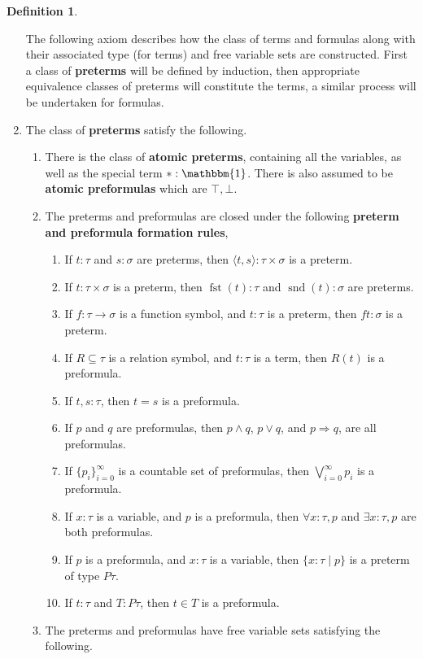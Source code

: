\documentclass{birkjour}
\theoremstyle{plain}
\theoremstyle{definition}
\newtheorem{definition}[thm]{Definition} %
\begin{document}
\begin{definition}
\begin{enumerate}
			The following axiom describes how the class of terms and formulas along with their associated type (for terms) and free variable sets are constructed. First a class of \textbf{preterms} will be defined by induction, then appropriate equivalence classes of preterms will constitute the terms, a similar process will be undertaken for formulas.
			\item The class of \textbf{preterms} satisfy the following.
			\begin{enumerate}
				\item There is the class of \textbf{atomic preterms}, containing all the variables, as well as the special term $\ast : \mathbbm{1}$. There is also assumed to be \textbf{atomic preformulas} which are $\top, \bot$.
				\item The preterms and preformulas are closed under the following \textbf{preterm and preformula formation rules},
				\begin{enumerate}
					\item If $t:\tau$ and $s:\sigma$ are preterms, then $\langle t,s\rangle : \tau \times \sigma$ is a preterm.
					\item If $t: \tau \times \sigma$ is a preterm, then $\operatorname{fst}(t) : \tau$ and $\operatorname{snd}(t) : \sigma$ are preterms.
					\item If $f:\tau \to \sigma$ is a function symbol, and $t:\tau$ is a preterm, then $ft:\sigma$ is a preterm.
					\item If $R \subseteq \tau$ is a relation symbol, and $t:\tau$ is a term, then $R(t)$ is a preformula.
					\item If $t,s:\tau$, then $t = s$ is a preformula.
					\item If $p$ and $q$ are preformulas, then $p \wedge q$, $p \vee q$, and $p \Rightarrow q$, are all preformulas.
					\item If $\lbrace p_i\rbrace_{i = 0}^\infty$ is a countable set of preformulas, then $\bigvee_{i = 0}^\infty p_i$ is a preformula.
					\item If $x : \tau$ is a variable, and $p$ is a preformula, then $\forall x : \tau, p$ and $\exists x : \tau, p$ are both preformulas.
					\item If $p$ is a preformula, and $x : \tau$ is a variable, then $\lbrace x : \tau \mid p\rbrace$ is a preterm of type $P\tau$.
					\item If $t : \tau$ and $T : P\tau$, then $t \in T$ is a preformula.
				\end{enumerate}
				\item The preterms and preformulas have free variable sets satisfying the following.

\end{enumerate}
\end{enumerate}
\end{definition}
\end{document}
